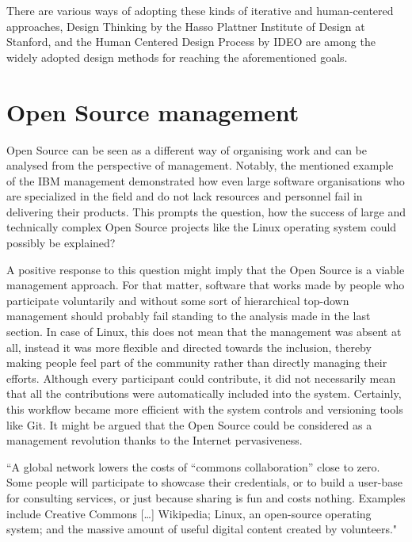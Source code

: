 There are various ways of adopting these kinds of iterative and human-centered approaches, Design Thinking by the Hasso Plattner Institute of Design at Stanford, and the Human Centered Design Process by IDEO are among the widely adopted design methods for reaching the aforementioned goals.

\section{Open Source management}
\label{sec:OSManagement}

Open Source can be seen as a different way of organising work and can be analysed from the perspective of management. Notably, the mentioned example of the IBM management demonstrated how even large software organisations who are specialized in the field and do not lack resources and personnel fail in delivering their products. This prompts the question, how the success of large and technically complex Open Source projects like the Linux operating system could possibly be explained?

A positive response to this question might imply that the Open Source is a viable management approach. For that matter, software that works made by people who participate voluntarily and without some sort of hierarchical top-down management should probably fail standing to the analysis made in the last section. In case of Linux, this does not mean that the management was absent at all, instead it was more flexible and directed towards the inclusion, thereby making people feel part of the community rather than directly managing their efforts. Although every participant could contribute, it did not necessarily mean that all the contributions were automatically included into the system. Certainly, this workflow became more efficient with the system controls and versioning tools like Git.
It might be argued that the Open Source could be considered as a management revolution thanks to the Internet pervasiveness. 

\begin{displayquote}
    “A global network lowers the costs of “commons collaboration” close to zero. Some people will participate to showcase their credentials, or to build a user-base for consulting services, or just because sharing is fun and costs nothing. Examples include Creative Commons […] Wikipedia; Linux, an open-source operating system; and the massive amount of useful digital content created by volunteers."
\end{displayquote}

